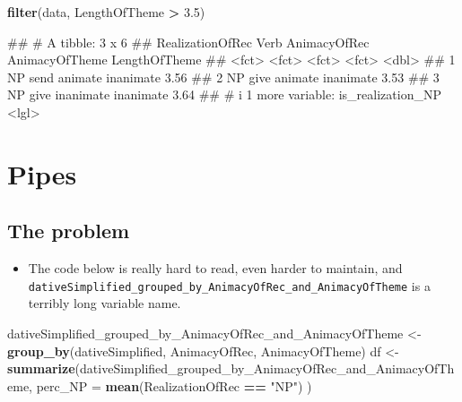 \documentclass[
]{book}
\newenvironment{Shaded}{\begin{snugshade}}{\end{snugshade}}
\newcommand{\AttributeTok}[1]{\textcolor[rgb]{0.13,0.29,0.53}{#1}}
\newcommand{\FloatTok}[1]{\textcolor[rgb]{0.00,0.00,0.81}{#1}}
\newcommand{\FunctionTok}[1]{\textcolor[rgb]{0.13,0.29,0.53}{\textbf{#1}}}
\newcommand{\NormalTok}[1]{#1}
\newcommand{\OtherTok}[1]{\textcolor[rgb]{0.56,0.35,0.01}{#1}}
\newcommand{\SpecialCharTok}[1]{\textcolor[rgb]{0.81,0.36,0.00}{\textbf{#1}}}
\newcommand{\StringTok}[1]{\textcolor[rgb]{0.31,0.60,0.02}{#1}}
\providecommand{\tightlist}{%
  \setlength{\itemsep}{0pt}\setlength{\parskip}{0pt}}
\begin{document}
\begin{Shaded}
\begin{Highlighting}[]
\FunctionTok{filter}\NormalTok{(data, LengthOfTheme }\SpecialCharTok{\textgreater{}} \FloatTok{3.5}\NormalTok{)}
\end{Highlighting}
\end{Shaded}

\begin{Shaded}
\begin{Highlighting}[]
\NormalTok{\#\# \# A tibble: 3 x 6}
\NormalTok{\#\#   RealizationOfRec Verb  AnimacyOfRec AnimacyOfTheme LengthOfTheme}
\NormalTok{\#\#   \textless{}fct\textgreater{}            \textless{}fct\textgreater{} \textless{}fct\textgreater{}        \textless{}fct\textgreater{}                  \textless{}dbl\textgreater{}}
\NormalTok{\#\# 1 NP               send  animate      inanimate               3.56}
\NormalTok{\#\# 2 NP               give  animate      inanimate               3.53}
\NormalTok{\#\# 3 NP               give  inanimate    inanimate               3.64}
\NormalTok{\#\# \# i 1 more variable: is\_realization\_NP \textless{}lgl\textgreater{}}
\end{Highlighting}
\end{Shaded}

\section{Pipes}\label{pipes}

\subsection{The problem}\label{the-problem}

\begin{itemize}
\tightlist
\item
  The code below is really hard to read, even harder to maintain, and \texttt{dativeSimplified\_grouped\_by\_AnimacyOfRec\_and\_AnimacyOfTheme} is a terribly long variable name.
\end{itemize}

\begin{Shaded}
\begin{Highlighting}[]
\NormalTok{dativeSimplified\_grouped\_by\_AnimacyOfRec\_and\_AnimacyOfTheme }\OtherTok{\textless{}{-}}
      \FunctionTok{group\_by}\NormalTok{(dativeSimplified, AnimacyOfRec, AnimacyOfTheme)}
\NormalTok{df }\OtherTok{\textless{}{-}} \FunctionTok{summarize}\NormalTok{(dativeSimplified\_grouped\_by\_AnimacyOfRec\_and\_AnimacyOfTheme, }
                  \AttributeTok{perc\_NP =} \FunctionTok{mean}\NormalTok{(RealizationOfRec }\SpecialCharTok{==} \StringTok{"NP"}\NormalTok{) )}
\end{Highlighting}
\end{Shaded}
\end{document}
